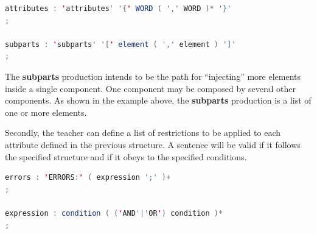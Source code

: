 \begin{center}
\begin{minipage}{13cm}
\begin{lstlisting}[language=java, basicstyle=\small, label={lst:dsl_attrs_prod}, caption=DSL attributes/subparts productions]
attributes : 'attributes' '{' WORD ( ',' WORD )* '}'
;

subparts : 'subparts' '[' element ( ',' element ) ']'
;
\end{lstlisting}
\end{minipage}
\end{center}

%


The \textbf{subparts} production intends to be the path for ``injecting'' more elements inside a single component. One component may be composed by several other components. As shown in the example above, the \textbf{subparts} production is a list of one or more elements.

Secondly, the teacher can define a list of restrictions to be applied to each attribute defined in the previous structure. A sentence will be valid if it follows the specified structure and if it obeys to the specified conditions.

\begin{center}
\begin{minipage}{12cm}
\begin{lstlisting}[language=java, basicstyle=\small, label={lst:dsl_errors_prod}, caption=DSL errors/expression productions]
errors : 'ERRORS:' ( expression ';' )+
;

expression : condition ( ('AND'|'OR') condition )*
;
\end{lstlisting}
\end{minipage}
\end{center}

